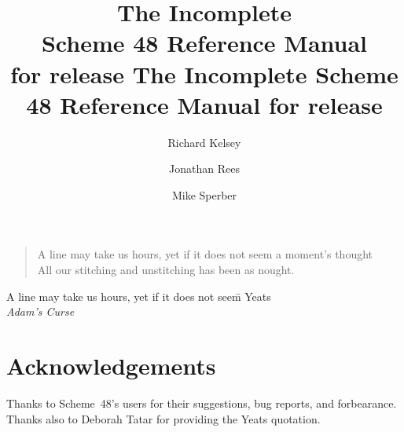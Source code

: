 \documentclass[twoside]{report}
\begin{document}
\frontmatter
\label{top_node}

\texonly
\title{{\large The Incomplete} \\ Scheme 48 Reference Manual \\
 {\large for release }}
\endtexonly
\htmlonly
\title{The Incomplete Scheme 48 Reference Manual for release }
\endhtmlonly
\author{Richard Kelsey \and Jonathan Rees \and Mike Sperber}
\date{}

\maketitle

\begin{verse}
A line may take us hours, yet if it does not seem a moment's thought \\
All our stitching and unstitching has been as nought.
\end{verse}
\begin{tabbing}
A line may take us hours, yet if it does not seem\= \kill
\> Yeats \\
\> {\em Adam's Curse}
\end{tabbing}

\chapter*{Acknowledgements}

Thanks to Scheme~48's users for their suggestions, bug reports,
  and forbearance.
Thanks also to Deborah Tatar for providing the Yeats quotation.

\tableofcontents

\texonly
\cleardoublepage{}\setcounter{page}{1}
\endtexonly

\mainmatter











\backmatter
\printindex
\end{document}
